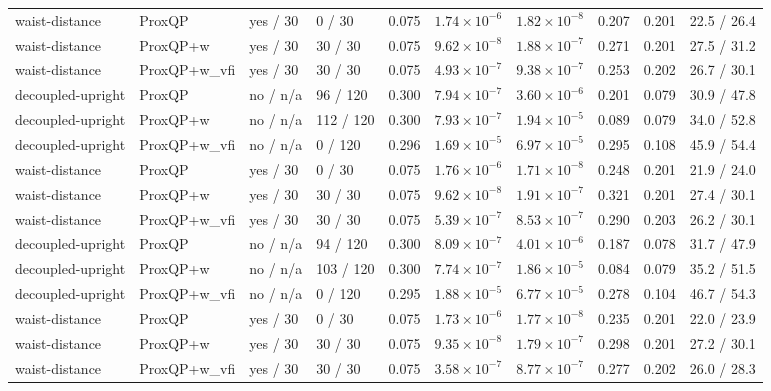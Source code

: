 \begin{tabular}{llllllllll}
waist-distance & ProxQP & yes / 30 & 0 / 30 & 0.075 & $1.74\times 10^{-6}$ & $1.82\times 10^{-8}$ & 0.207 & 0.201 & 22.5 / 26.4 \\
waist-distance & ProxQP+w & yes / 30 & 30 / 30 & 0.075 & $9.62\times 10^{-8}$ & $1.88\times 10^{-7}$ & 0.271 & 0.201 & 27.5 / 31.2 \\
waist-distance & ProxQP+w\_vfi & yes / 30 & 30 / 30 & 0.075 & $4.93\times 10^{-7}$ & $9.38\times 10^{-7}$ & 0.253 & 0.202 & 26.7 / 30.1 \\
decoupled-upright & ProxQP & no / n/a & 96 / 120 & 0.300 & $7.94\times 10^{-7}$ & $3.60\times 10^{-6}$ & 0.201 & 0.079 & 30.9 / 47.8 \\
decoupled-upright & ProxQP+w & no / n/a & 112 / 120 & 0.300 & $7.93\times 10^{-7}$ & $1.94\times 10^{-5}$ & 0.089 & 0.079 & 34.0 / 52.8 \\
decoupled-upright & ProxQP+w\_vfi & no / n/a & 0 / 120 & 0.296 & $1.69\times 10^{-5}$ & $6.97\times 10^{-5}$ & 0.295 & 0.108 & 45.9 / 54.4 \\
waist-distance & ProxQP & yes / 30 & 0 / 30 & 0.075 & $1.76\times 10^{-6}$ & $1.71\times 10^{-8}$ & 0.248 & 0.201 & 21.9 / 24.0 \\
waist-distance & ProxQP+w & yes / 30 & 30 / 30 & 0.075 & $9.62\times 10^{-8}$ & $1.91\times 10^{-7}$ & 0.321 & 0.201 & 27.4 / 30.1 \\
waist-distance & ProxQP+w\_vfi & yes / 30 & 30 / 30 & 0.075 & $5.39\times 10^{-7}$ & $8.53\times 10^{-7}$ & 0.290 & 0.203 & 26.2 / 30.1 \\
decoupled-upright & ProxQP & no / n/a & 94 / 120 & 0.300 & $8.09\times 10^{-7}$ & $4.01\times 10^{-6}$ & 0.187 & 0.078 & 31.7 / 47.9 \\
decoupled-upright & ProxQP+w & no / n/a & 103 / 120 & 0.300 & $7.74\times 10^{-7}$ & $1.86\times 10^{-5}$ & 0.084 & 0.079 & 35.2 / 51.5 \\
decoupled-upright & ProxQP+w\_vfi & no / n/a & 0 / 120 & 0.295 & $1.88\times 10^{-5}$ & $6.77\times 10^{-5}$ & 0.278 & 0.104 & 46.7 / 54.3 \\
waist-distance & ProxQP & yes / 30 & 0 / 30 & 0.075 & $1.73\times 10^{-6}$ & $1.77\times 10^{-8}$ & 0.235 & 0.201 & 22.0 / 23.9 \\
waist-distance & ProxQP+w & yes / 30 & 30 / 30 & 0.075 & $9.35\times 10^{-8}$ & $1.79\times 10^{-7}$ & 0.298 & 0.201 & 27.2 / 30.1 \\
waist-distance & ProxQP+w\_vfi & yes / 30 & 30 / 30 & 0.075 & $3.58\times 10^{-7}$ & $8.77\times 10^{-7}$ & 0.277 & 0.202 & 26.0 / 28.3 \\
\bottomrule
\end{tabular}
